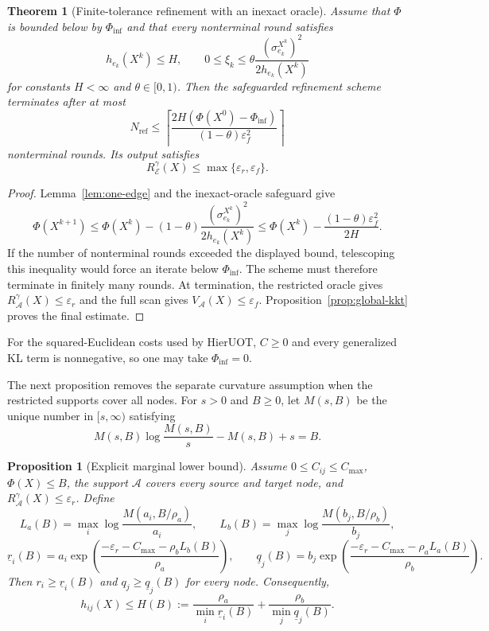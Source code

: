 \documentclass[11pt]{article}
\newtheorem{proposition}{Proposition}
\newtheorem{theorem}{Theorem}
\begin{document}
\begin{theorem}[Finite-tolerance refinement with an inexact oracle]\label{thm:inexact-refinement}
Assume that $\Phi$ is bounded below by $\Phi_{\inf}$ and that every nonterminal round satisfies
$$h_{e_k}(X^k)\leq H,\qquad 0\leq\xi_k\leq\theta\frac{(\sigma_{e_k}^{X^k})^2}{2h_{e_k}(X^k)}$$
for constants $H<\infty$ and $\theta\in[0,1)$.
Then the safeguarded refinement scheme terminates after at most
$$N_{\mathrm{ref}}\leq\left\lceil\frac{2H(\Phi(X^0)-\Phi_{\inf})}{(1-\theta)\varepsilon_f^2}\right\rceil$$
nonterminal rounds.
Its output satisfies
$$R_{\mathcal E}^{\gamma}(X)\leq\max\{\varepsilon_r,\varepsilon_f\}.$$
\end{theorem}

\begin{proof}
Lemma~\ref{lem:one-edge} and the inexact-oracle safeguard give
$$\Phi(X^{k+1})\leq\Phi(X^k)-(1-\theta)\frac{(\sigma_{e_k}^{X^k})^2}{2h_{e_k}(X^k)}\leq\Phi(X^k)-\frac{(1-\theta)\varepsilon_f^2}{2H}.$$
If the number of nonterminal rounds exceeded the displayed bound, telescoping this inequality would force an iterate below $\Phi_{\inf}$.
The scheme must therefore terminate in finitely many rounds.
At termination, the restricted oracle gives $R_{\mathcal A}^{\gamma}(X)\leq\varepsilon_r$ and the full scan gives $V_{\mathcal A}(X)\leq\varepsilon_f$.
Proposition~\ref{prop:global-kkt} proves the final estimate.
\end{proof}

For the squared-Euclidean costs used by HierUOT, $C\geq0$ and every generalized KL term is nonnegative, so one may take $\Phi_{\inf}=0$.

The next proposition removes the separate curvature assumption when the restricted supports cover all nodes.
For $s>0$ and $B\geq0$, let $M(s,B)$ be the unique number in $[s,\infty)$ satisfying
$$M(s,B)\log\frac{M(s,B)}{s}-M(s,B)+s=B.$$

\begin{proposition}[Explicit marginal lower bound]\label{prop:marginal-lower-bound}
Assume $0\leq C_{ij}\leq C_{\max}$, $\Phi(X)\leq B$, the support $\mathcal A$ covers every source and target node, and $R_{\mathcal A}^{\gamma}(X)\leq\varepsilon_r$.
Define
$$L_a(B)=\max_i\log\frac{M(a_i,B/\rho_a)}{a_i},\qquad L_b(B)=\max_j\log\frac{M(b_j,B/\rho_b)}{b_j},$$
$$\underline r_i(B)=a_i\exp\left(\frac{-\varepsilon_r-C_{\max}-\rho_bL_b(B)}{\rho_a}\right),\qquad \underline q_j(B)=b_j\exp\left(\frac{-\varepsilon_r-C_{\max}-\rho_aL_a(B)}{\rho_b}\right).$$
Then $r_i\geq\underline r_i(B)$ and $q_j\geq\underline q_j(B)$ for every node.
Consequently,
$$h_{ij}(X)\leq H(B):=\frac{\rho_a}{\min_i\underline r_i(B)}+\frac{\rho_b}{\min_j\underline q_j(B)}.$$
\end{proposition}
\end{document}
